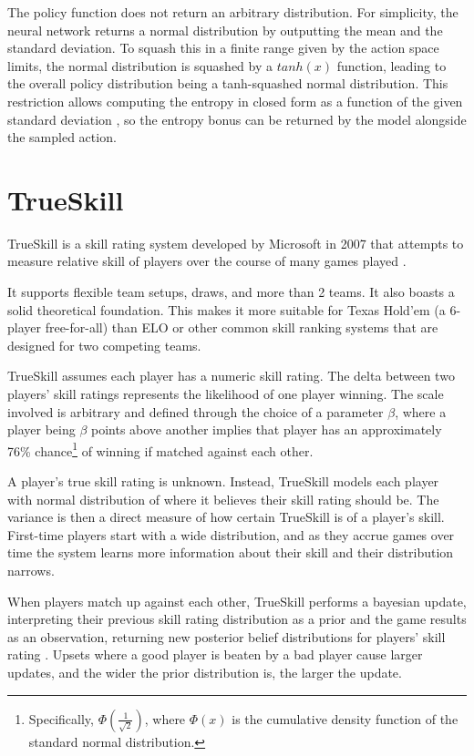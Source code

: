 The policy function does not return an arbitrary distribution. For simplicity, the neural network returns a normal distribution by outputting the mean and the standard deviation. To squash this in a finite range given by the action space limits, the normal distribution is squashed by a $tanh(x)$ function, leading to the overall policy distribution being a tanh-squashed normal distribution. This restriction allows computing the entropy in closed form as a function of the given standard deviation \cite[explained in detail in the code comments of the SpinningUp SAC implementation]{SpinningUp2018}, so the entropy bonus can be returned by the model alongside the sampled action.

\section{TrueSkill}

TrueSkill is a skill rating system developed by Microsoft in 2007 that attempts to measure relative skill of players over the course of many games played \cite{TrueSkill_original} \cite{TrueSkill_blog}.

It supports flexible team setups, draws, and more than 2 teams. It also boasts a solid theoretical foundation. This makes it more suitable for Texas Hold'em (a 6-player free-for-all) than ELO \cite{Elo} or other common skill ranking systems that are designed for two competing teams.

TrueSkill assumes each player has a numeric skill rating. The delta between two players' skill ratings represents the likelihood of one player winning. The scale involved is arbitrary and defined through the choice of a parameter $\beta$, where a player being $\beta$ points above another implies that player has an approximately 76\% chance\footnote{Specifically, $\Phi\left(\frac{1}{\sqrt{2}}\right)$, where $\Phi(x)$ is the cumulative density function of the standard normal distribution.} of winning if matched against each other.

A player's true skill rating is unknown. Instead, TrueSkill models each player with normal distribution of where it believes their skill rating should be. The variance is then a direct measure of how certain TrueSkill is of a player's skill. First-time players start with a wide distribution, and as they accrue games over time the system learns more information about their skill and their distribution narrows.

When players match up against each other, TrueSkill performs a bayesian update, interpreting their previous skill rating distribution as a prior and the game results as an observation, returning new posterior belief distributions for players' skill rating \cite{TrueSkill_original} \cite{TrueSkill_blog}. Upsets where a good player is beaten by a bad player cause larger updates, and the wider the prior distribution is, the larger the update.

